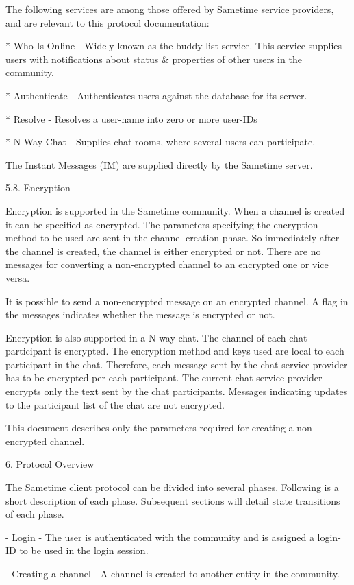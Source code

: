 \documentclass[titlepage,oneside]{book}
\begin{document}
The following services are among those offered by Sametime service
providers, and are relevant to this protocol documentation:

* Who Is Online - Widely known as the buddy list service. This service
supplies users with notifications about status & properties of other
users in the community.

* Authenticate - Authenticates users against the database for its
server.

* Resolve - Resolves a user-name into zero or more user-IDs

* N-Way Chat - Supplies chat-rooms, where several users can
participate.

The Instant Messages (IM) are supplied directly by the Sametime server.

5.8. Encryption

Encryption is supported in the Sametime community. When a channel is
created it can be specified as encrypted. The parameters specifying the
encryption method to be used are sent in the channel creation phase. So
immediately after the channel is created, the channel is either
encrypted or not. There are no messages for converting a non-encrypted
channel to an encrypted one or vice versa.

It is possible to send a non-encrypted message on an encrypted channel.
A flag in the messages indicates whether the message is encrypted or
not.

Encryption is also supported in a N-way chat. The channel of each chat
participant is encrypted. The encryption method and keys used are local
to each participant in the chat. Therefore, each message sent by the
chat service provider has to be encrypted per each participant. The
current chat service provider encrypts only the text sent by the chat
participants. Messages indicating updates to the participant list of
the chat are not encrypted.

This document describes only the parameters required for creating
a non-encrypted channel.

6. Protocol Overview

The Sametime client protocol can be divided into several phases.
Following is a short description of each phase. Subsequent sections
will detail state transitions of each phase.

- Login - The user is authenticated with the community and is assigned
a login-ID to be used in the login session.

- Creating a channel - A channel is created to another entity in the
community.
\end{document}

